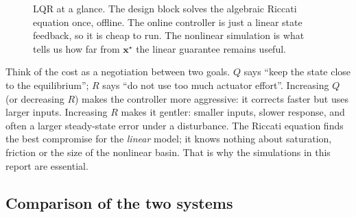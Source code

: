 \documentclass[11pt]{article}
\newcommand{\x}{\mathbf{x}}
\begin{document}
\begin{figure}[htbp]
\centering
{}
\caption{LQR at a glance.  The design block solves the algebraic Riccati
equation once, offline.  The online controller is just a linear state
feedback, so it is cheap to run.  The nonlinear simulation is what tells us
how far from $\x^\star$ the linear guarantee remains useful.}
\label{fig:lqr_block}
\end{figure}

\begin{intuition}[title={Reading $Q$ and $R$}]
Think of the cost as a negotiation between two goals.  $Q$ says ``keep the
state close to the equilibrium''; $R$ says ``do not use too much actuator
effort''.  Increasing $Q$ (or decreasing $R$) makes the controller more
aggressive: it corrects faster but uses larger inputs.  Increasing $R$ makes
it gentler: smaller inputs, slower response, and often a larger steady-state
error under a disturbance.  The Riccati equation finds the best compromise
for the \emph{linear} model; it knows nothing about saturation, friction or
the size of the nonlinear basin.  That is why the simulations in this report
are essential.
\end{intuition}

\subsection{Comparison of the two systems}
\end{document}
